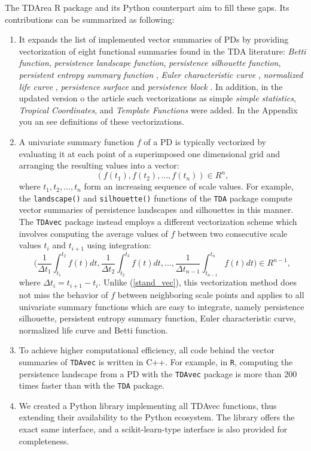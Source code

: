 \documentclass[conference, onecolumn]{IEEEtran}
\begin{document}
The TDArea R package and its Python counterpart aim to fill these gaps. Its contributions can be summarized as following:
\begin{enumerate}
\item It expands the list of implemented vector summaries of PDs by providing vectorization of eight functional summaries found in the TDA literature: \emph{Betti function}, \emph{persistence landscape function}, \emph{persistence silhouette function}, \emph{persistent entropy summary function} \cite{atienza2020stability}, \emph{Euler characteristic curve} \cite{richardson2014efficient}, \emph{normalized life curve} \cite{chung2022persistence}, \emph{persistence surface} \cite{adams2017persistence} and \emph{persistence block} \cite{chan2022computationally}. In addition, in the updated version o the article such vectorizations as simple \emph{simple statistics}, \emph{Tropical Coordinates}, and \emph{Template Functions} \cite{TentFunction} were added. In the Appendix you an see definitions of these vectorizations.
\item A univariate summary function $f$ of a PD is typically vectorized by evaluating it at each point of a superimposed one dimensional grid and arranging the resulting values into a vector:
%
  \begin{equation}\label{stand_vec}
		(f(t_1),f(t_2),\ldots,f(t_n))\in {R}^n,
\end{equation}
where $t_1,t_2,\ldots,t_n$ form an increasing sequence of scale values. For example, the \texttt{landscape()} and \texttt{silhouette()} functions of the \texttt{TDA} package compute vector summaries of persistence landscapes and silhouettes in this manner. The \texttt{TDAvec} package instead employs a different vectorization scheme which involves computing the average values of $f$ between two consecutive scale values $t_i$ and $t_{i+1}$ using integration: 
\begin{equation} 
	\Big(\frac{1}{\Delta t_1}\int_{t_1}^{t_2}f(t)dt,\frac{1}{\Delta t_2}\int_{t_2}^{t_3}f(t)dt,\ldots,\frac{1}{\Delta t_{n-1}}\int_{t_{n-1}}^{t_n}f(t)dt\Big)\in{R}^{n-1}, 
\end{equation}
where $\Delta t_i=t_{i+1}-t_i$. Unlike (\ref{stand_vec}), this vectorization method does not miss the behavior of $f$ between neighboring scale points and applies to all univariate summary functions which are easy to integrate, namely persistence silhouette, persistent entropy summary function, Euler characteristic curve, normalized life curve and Betti function. 
%
\item To achieve higher computational efficiency, all code behind the vector summaries of \texttt{TDAvec} is written in C++. For example, in \texttt{R}, computing the persistence landscape from a PD with the \texttt{TDAvec} package is more than 200 times faster than with the \texttt{TDA} package.
%
\item  We created a Python library implementing all TDAvec functions, thus extending their availability to the Python ecosystem. The library offers the exact same interface, and a scikit-learn-type interface is also provided for completeness.
\end{enumerate}
\end{document}
